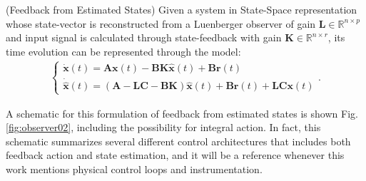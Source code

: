 \documentclass[a4paper,11pt]{book}
\numberwithin{figure}{chapter}
\numberwithin{equation}{chapter}
\numberwithin{table}{chapter}
\theoremstyle{definition}
\newtheorem{definition}{Definition}[chapter]
\newcounter{boxed-theorem}
\newcounter{boxed-definition}
\newenvironment{boxed-definition}[1]
{\begin{shaded} \begin{definition}{#1}}
{\end{definition} \end{shaded}}
\begin{document}
\begin{boxed-definition}{(Feedback from Estimated States)} \label{def:fdbckLuenberger}
    Given a system in State-Space representation whose state-vector is reconstructed from a Luenberger observer of gain $\bm{L} \in \mathbb{R}^{n \times p}$ and input signal is calculated through state-feedback with gain $\bm{K} \in \mathbb{R}^{n \times r}$, its time evolution can be represented through the model:
    \begin{align} \label{eq:fdbckLuenberger01}
    \begin{cases}
        \dot{\bm{x}}(t) = \bm{A} \bm{x}(t) - \bm{B} \bm{K} \hat{\bm{x}}(t) + \bm{B} \bm{r}(t) \\
        \dot{\hat{\bm{x}}}(t) = \left(\bm{A} - \bm{L} \bm{C} - \bm{B} \bm{K} \right) \hat{\bm{x}}(t) + \bm{B} \bm{r}(t) + \bm{L} \bm{C} \bm{x}(t) 
    \end{cases}
    .\end{align}
\end{boxed-definition} 

A schematic for this formulation of feedback from estimated states is shown Fig. \ref{fig:observer02}, including the possibility for integral action. In fact, this schematic summarizes several different control architectures that includes both feedback action and state estimation, and it will be a reference whenever this work mentions physical control loops and instrumentation.
\end{document}
